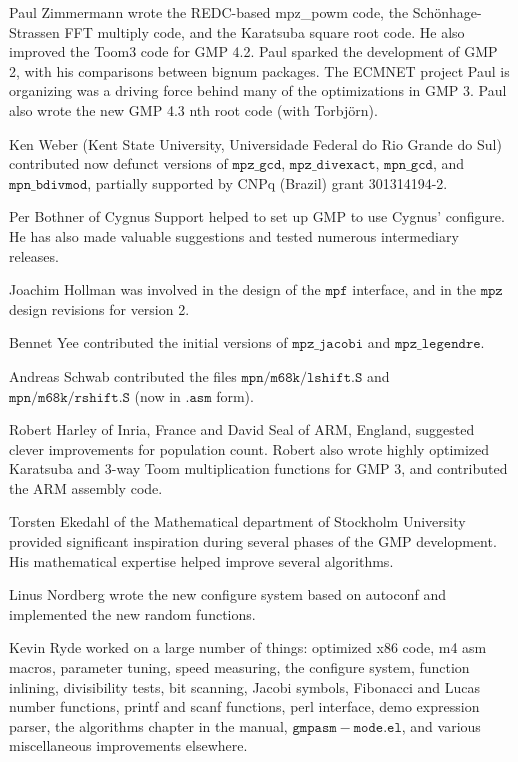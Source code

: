 \vpara
Paul Zimmermann wrote the REDC-based mpz\_powm code, the Sch\"onhage-Strassen
FFT multiply code, and the Karatsuba square root code.  He also improved the
Toom3 code for GMP 4.2.  Paul sparked the development of GMP 2, with his
comparisons between bignum packages.  The ECMNET project Paul is organizing
was a driving force behind many of the optimizations in GMP 3.  Paul also
wrote the new GMP 4.3 nth root code (with Torbj\"orn).

\vpara
Ken Weber (Kent State University, Universidade Federal do Rio Grande do Sul)
contributed now defunct versions of $\mathtt{mpz\_gcd}$, $\mathtt{mpz\_divexact}$,
$\mathtt{mpn\_gcd}$, and $\mathtt{mpn\_bdivmod}$, partially supported by CNPq (Brazil)
grant 301314194-2.

\vpara
Per Bothner of Cygnus Support helped to set up GMP to use Cygnus' configure.
He has also made valuable suggestions and tested numerous intermediary
releases.

\vpara
Joachim Hollman was involved in the design of the $\mathtt{mpf}$ interface, and in
the $\mathtt{mpz}$ design revisions for version 2.

\vpara
Bennet Yee contributed the initial versions of $\mathtt{mpz\_jacobi}$ and
$\mathtt{mpz\_legendre}$.

\vpara
Andreas Schwab contributed the files $\mathtt{mpn/m68k/lshift.S}$ and
$\mathtt{mpn/m68k/rshift.S}$ (now in $\mathtt{.asm}$ form).

\vpara
Robert Harley of Inria, France and David Seal of ARM, England, suggested clever
improvements for population count.  Robert also wrote highly optimized
Karatsuba and 3-way Toom multiplication functions for GMP 3, and contributed
the ARM assembly code.

\vpara
Torsten Ekedahl of the Mathematical department of Stockholm University provided
significant inspiration during several phases of the GMP development.  His
mathematical expertise helped improve several algorithms.

\vpara
Linus Nordberg wrote the new configure system based on autoconf and
implemented the new random functions.

\vpara
Kevin Ryde worked on a large number of things: optimized x86 code, m4 asm
macros, parameter tuning, speed measuring, the configure system, function
inlining, divisibility tests, bit scanning, Jacobi symbols, Fibonacci and Lucas
number functions, printf and scanf functions, perl interface, demo expression
parser, the algorithms chapter in the manual, $\mathtt{gmpasm-mode.el}$, and
various miscellaneous improvements elsewhere.

